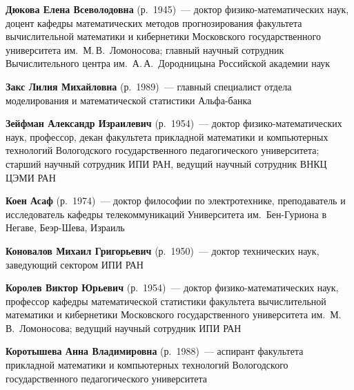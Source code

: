\begin{multicols}{2}
\vspace*{4pt}



\noindent
\textbf{Дюкова Елена Всеволодовна} (р.\ 1945)~--- доктор фи\-зи\-ко-математических наук,
доцент кафедры математических методов прогнозирования факультета
вычислительной математики и 
кибернетики Московского государственного университета им.\ М.\,В.~Ломоносова;
главный научный сотрудник Вычислительного центра им.\ А.\,А.~Дородницына Российской академии наук

\vspace*{4pt}

\noindent
\textbf{Закс Лилия Михайловна} (р.\ 1989)~--- главный специалист отдела 
моделирования и математической статистики Аль\-фа-банка

\columnbreak


\noindent
\textbf{Зейфман Александр Израилевич} (р.\ 1954)~--- доктор фи\-зи\-ко-ма\-те\-ма\-ти\-че\-ских наук, профессор,
декан факультета прикладной математики и компьютерных технологий Вологодского государственного
педагогического университета; старший научный сотрудник ИПИ РАН, ведущий научный
сотрудник ВНКЦ ЦЭМИ РАН

\vspace*{4pt}



\noindent
\textbf{Коен Асаф} (р.\ 1974)~--- доктор философии по электротехнике, 
преподаватель и исследователь ка\-фед\-ры телекоммуникаций 
Университета им.\ Бен-Гу\-ри\-она в Негаве, Беэр-Шева, Израиль

\vspace*{4pt}


\noindent
\textbf{Коновалов Михаил Григорьевич} (р.\ 1950)~--- доктор технических наук, заведующий
сектором ИПИ РАН


\vspace*{4pt}


\noindent
\textbf{Королев Виктор Юрьевич} (р.\ 1954)~--- доктор фи\-зи\-ко-ма\-те\-ма\-ти\-че\-ских наук, 
профессор кафедры математической статистики факультета вычислительной математики и кибернетики 
Московского государ\-ст\-вен\-но\-го университета им.\ М.\,В.~Ломоносова; 
ведущий научный сотрудник ИПИ РАН

\vspace*{4pt}

\noindent
\textbf{Коротышева Анна Владимировна} (р.\ 1988)~--- аспирант факультета прикладной математики и 
компьютерных технологий Вологодского государственного
педагогического университета




\end{multicols}
